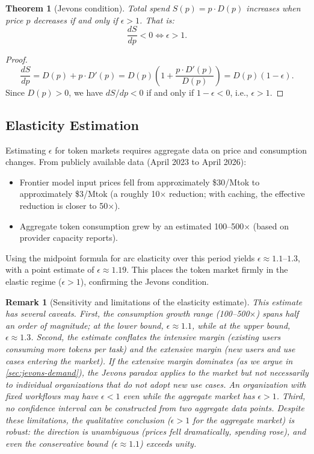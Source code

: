 \documentclass[11pt, a4paper, copyright]{googledeepmind}
\newtheorem{theorem}{Theorem}[section]
\newtheorem*{remark}{Remark}
\begin{document}
\begin{theorem}[Jevons condition]\label{thm:jevons}
Total spend $S(p) = p \cdot D(p)$ increases when price $p$ decreases if and only if $\epsilon > 1$. That is:
\begin{equation}\label{eq:jevons-condition}
    \frac{dS}{dp} < 0 \iff \epsilon > 1.
\end{equation}
\end{theorem}

\begin{proof}
\[
    \frac{dS}{dp} = D(p) + p \cdot D'(p) = D(p)\left(1 + \frac{p \cdot D'(p)}{D(p)}\right) = D(p)(1 - \epsilon).
\]
Since $D(p) > 0$, we have $dS/dp < 0$ if and only if $1 - \epsilon < 0$, i.e., $\epsilon > 1$.
\end{proof}

\subsection{Elasticity Estimation}

Estimating $\epsilon$ for token markets requires aggregate data on price and consumption changes. From publicly available data (April 2023 to April 2026):
\begin{itemize}[nosep]
    \item Frontier model input prices fell from approximately \$30/Mtok to approximately \$3/Mtok (a roughly 10$\times$ reduction; with caching, the effective reduction is closer to 50$\times$).
    \item Aggregate token consumption grew by an estimated 100--500$\times$ (based on provider capacity reports).
\end{itemize}

Using the midpoint formula for arc elasticity over this period yields $\epsilon \approx 1.1$--$1.3$, with a point estimate of $\epsilon \approx 1.19$. This places the token market firmly in the elastic regime ($\epsilon > 1$), confirming the Jevons condition.

\begin{remark}[Sensitivity and limitations of the elasticity estimate]
This estimate has several caveats. First, the consumption growth range (100--500$\times$) spans half an order of magnitude; at the lower bound, $\epsilon \approx 1.1$, while at the upper bound, $\epsilon \approx 1.3$. Second, the estimate conflates the intensive margin (existing users consuming more tokens per task) and the extensive margin (new users and use cases entering the market). If the extensive margin dominates (as we argue in \cref{sec:jevons-demand}), the Jevons paradox applies to the \emph{market} but not necessarily to individual organizations that do not adopt new use cases. An organization with fixed workflows may have $\epsilon < 1$ even while the aggregate market has $\epsilon > 1$. Third, no confidence interval can be constructed from two aggregate data points. Despite these limitations, the qualitative conclusion ($\epsilon > 1$ for the aggregate market) is robust: the direction is unambiguous (prices fell dramatically, spending rose), and even the conservative bound ($\epsilon \approx 1.1$) exceeds unity.
\end{remark}
\end{document}
